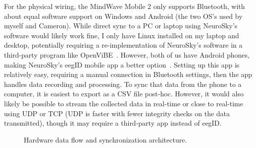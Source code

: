 \documentclass[journal]{IEEEtran}
\begin{document}
For the physical wiring, the MindWave Mobile 2 only supports Bluetooth, with about equal software support on Windows and Android (the two OS's used by myself and Cameron). While direct sync to a PC or laptop using NeuroSky's software would likely work fine, I only have Linux installed on my laptop and desktop, potentially requiring a re-implementation of NeuroSky's software in a third-party program like OpenViBE~\cite{neurosky2018mwm2,openvibe2013}. However, both of us have Android phones, making NeuroSky's eegID mobile app a better option~\cite{neurosky2026eegid}. Setting up this app is relatively easy, requiring a manual connection in Bluetooth settings, then the app handles data recording and processing. To sync that data from the phone to a computer, it is easiest to export as a CSV file post-hoc. However, it would also likely be possible to stream the collected data in real-time or close to real-time using UDP or TCP (UDP is faster with fewer integrity checks on the data transmitted), though it may require a third-party app instead of eegID.

\begin{figure}[htbp]
    \centering
    \caption{Hardware data flow and synchronization architecture.}
    \label{fig:data_flow}
\end{figure}
\end{document}
